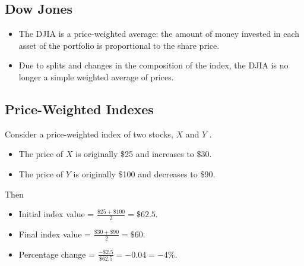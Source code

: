 \documentclass[letterpaper,10pt,english]{sphinxmanual}
\begin{document}
\subsection{Dow Jones}
\label{indexes:id1}\begin{itemize}
\item {} 
The DJIA is a price-weighted average: the amount of money invested
in each asset of the portfolio is proportional to the share price.

\end{itemize}
\begin{itemize}
\item {} 
Due to splits and changes in the composition of the index, the DJIA
is no longer a simple weighted average of prices.

\end{itemize}


\subsection{Price-Weighted Indexes}
\label{indexes:price-weighted-indexes}
Consider a price-weighted index of two stocks, $X$ and $Y$
.
\begin{itemize}
\item {} 
The price of $X$ is originally \$25 and increases to \$30.

\end{itemize}
\begin{itemize}
\item {} 
The price of $Y$ is originally \$100 and decreases to \$90.

\end{itemize}

Then
\begin{itemize}
\item {} 
Initial index value = $\frac{\$25+\$100}{2} = \$62.5$.

\end{itemize}
\begin{itemize}
\item {} 
Final index value = $\frac{\$30+\$90}{2} = \$60$.

\end{itemize}
\begin{itemize}
\item {} 
Percentage change = $\frac{-\$2.5}{\$62.5} = -0.04 = -4\%$.

\end{itemize}
\end{document}
